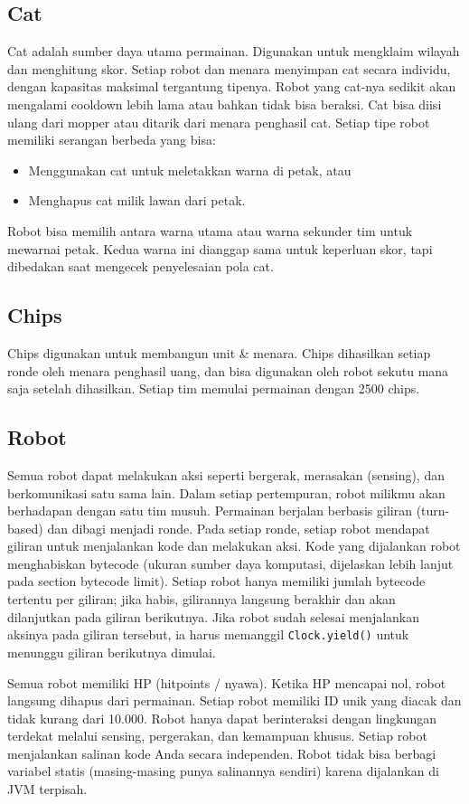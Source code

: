 \subsection{Cat}
Cat adalah sumber daya utama permainan. Digunakan untuk mengklaim wilayah dan menghitung skor. Setiap robot dan menara menyimpan cat secara individu, dengan kapasitas maksimal tergantung tipenya. Robot yang cat-nya sedikit akan mengalami cooldown lebih lama atau bahkan tidak bisa beraksi. Cat bisa diisi ulang dari mopper atau ditarik dari menara penghasil cat.
Setiap tipe robot memiliki serangan berbeda yang bisa:
\begin{itemize}
    \item Menggunakan cat untuk meletakkan warna di petak, atau
    \item Menghapus cat milik lawan dari petak.
\end{itemize}
Robot bisa memilih antara warna utama atau warna sekunder tim untuk mewarnai petak. Kedua warna ini dianggap sama untuk keperluan skor, tapi dibedakan saat mengecek penyelesaian pola cat.

\subsection{Chips}
Chips digunakan untuk membangun unit \& menara. Chips dihasilkan setiap ronde oleh menara penghasil uang, dan bisa digunakan oleh robot sekutu mana saja setelah dihasilkan. Setiap tim memulai permainan dengan 2500 chips.

\subsection{Robot}
Semua robot dapat melakukan aksi seperti bergerak, merasakan (sensing), dan berkomunikasi satu sama lain. Dalam setiap pertempuran, robot milikmu akan berhadapan dengan satu tim musuh. Permainan berjalan berbasis giliran (turn-based) dan dibagi menjadi ronde. Pada setiap ronde, setiap robot mendapat giliran untuk menjalankan kode dan melakukan aksi. Kode yang dijalankan robot menghabiskan bytecode (ukuran sumber daya komputasi, dijelaskan lebih lanjut pada section bytecode limit). Setiap robot hanya memiliki jumlah bytecode tertentu per giliran; jika habis, gilirannya langsung berakhir dan akan dilanjutkan pada giliran berikutnya. Jika robot sudah selesai menjalankan aksinya pada giliran tersebut, ia harus memanggil \texttt{Clock.yield()} untuk menunggu giliran berikutnya dimulai.

Semua robot memiliki HP (hitpoints / nyawa). Ketika HP mencapai nol, robot langsung dihapus dari permainan. Setiap robot memiliki ID unik yang diacak dan tidak kurang dari 10.000. Robot hanya dapat berinteraksi dengan lingkungan terdekat melalui sensing, pergerakan, dan kemampuan khusus. Setiap robot menjalankan salinan kode Anda secara independen. Robot tidak bisa berbagi variabel statis (masing-masing punya salinannya sendiri) karena dijalankan di JVM terpisah.

